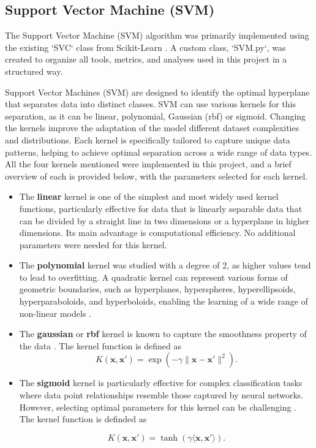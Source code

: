 \subsection{Support Vector Machine (SVM)}\label{methodology-svm-sec}
The Support Vector Machine (SVM) algorithm was primarily implemented using the existing `SVC` class from Scikit-Learn \cite{sk-svm}. A custom class, `SVM.py`, was created to organize all tools, metrics, and analyses used in this project in a structured way. \newline

Support Vector Machines (SVM) are designed to identify the optimal hyperplane that separates data into distinct classes. SVM can use various kernels for this separation, as it can be linear, polynomial, Gaussian (rbf) or sigmoid. Changing the kernels improve the adaptation of the model different dataset complexities and distributions. Each kernel is specifically tailored to capture unique data patterns, helping to achieve optimal separation across a wide range of data types.
\newline
All the four kernels mentioned were implemented in this project, and a brief overview of each is provided below, with the parameters selected for each kernel.

\begin{itemize}
    \item The \textbf{linear} kernel is one of the simplest and most widely used kernel functions, particularly effective for data that is linearly separable data that can be divided by a straight line in two dimensions or a hyperplane in higher dimensions. Its main advantage is computational efficiency. No additional parameters were needed for this kernel.
\item The \textbf{polynomial} kernel was studied with a degree of 2, as higher values tend to lead to overfitting. A quadratic kernel can represent various forms of geometric boundaries, such as hyperplanes, hyperspheres, hyperellipsoids, hyperparaboloids, and hyperboloids, enabling the learning of a wide range of non-linear models \cite{quadratic}.
\item The \textbf{gaussian} or \textbf{rbf} kernel is known to capture the smoothness property of the data \cite{rbf}. The kernel function is defined as 
$$
K(\mathbf{x}, \mathbf{x'}) = \exp ( - \gamma \|\mathbf{x} - \mathbf{x'}\|^2 ).
$$

\item The \textbf{sigmoid} kernel is particularly effective for complex classification tasks where data point relationships resemble those captured by neural networks. However, selecting optimal parameters for this kernel can be challenging \cite{tanh}. The kernel function is definded as

$$
K(\mathbf{x}, \mathbf{x'}) = \tanh  ( \gamma \langle \mathbf{x} , \mathbf{x'} \rangle ).
$$



\end{itemize}

